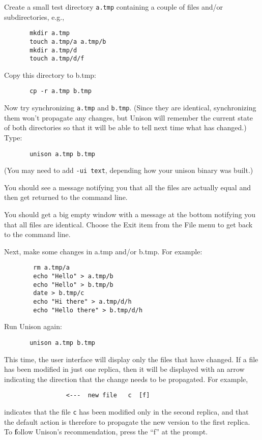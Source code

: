 \documentclass{article}
\begin{document}
Create a small test directory {\tt a.tmp} containing a couple of files
and/or subdirectories, e.g.,
\begin{verbatim}
       mkdir a.tmp
       touch a.tmp/a a.tmp/b
       mkdir a.tmp/d
       touch a.tmp/d/f
\end{verbatim}
Copy this directory to b.tmp:
\begin{verbatim}
       cp -r a.tmp b.tmp
\end{verbatim}

Now try synchronizing {\tt a.tmp} and {\tt b.tmp}.  (Since they are
identical, synchronizing them won't propagate any changes, but Unison
will remember the current state of both directories so that it will be
able to tell next time what has changed.)  Type:
\begin{verbatim}
       unison a.tmp b.tmp
\end{verbatim}
(You may need to add \verb|-ui text|, depending how your unison binary was built.)

\begin{textui}
You should see a message notifying you that all the files are actually
equal and then get returned to the command line.
\end{textui}

\begin{tkui}
You should get a big empty window with a message at the bottom
notifying you that all files are identical.  Choose the Exit item from
the File menu to get back to the command line.
\end{tkui}

Next, make some changes in a.tmp and/or b.tmp.  For example:
\begin{verbatim}
        rm a.tmp/a
        echo "Hello" > a.tmp/b
        echo "Hello" > b.tmp/b
        date > b.tmp/c
        echo "Hi there" > a.tmp/d/h
        echo "Hello there" > b.tmp/d/h
\end{verbatim}
Run Unison again:
\begin{verbatim}
       unison a.tmp b.tmp
\end{verbatim}

This time, the user interface will display only the files that have
changed.  If a file has been modified in just one
replica, then it will be displayed with an arrow indicating the
direction that the change needs to be propagated.  For example, 
\begin{verbatim}
                 <---  new file   c  [f]
\end{verbatim}
\noindent
indicates that the file {\tt c} has been modified only in the second
replica, and that the default action is therefore to propagate the new
version to the first replica.  To {\bf f}ollow Unison's recommendation,
press the ``f'' at the prompt.
\end{document}
